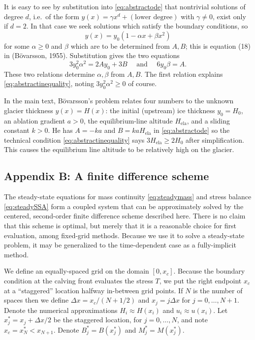 \documentclass[review,letterpaper]{igs}
\renewcommand{\dh}{\fontencoding{T1}\selectfont{\symbol{240}}}
\newcommand{\bod}{B\"o\dh varsson\xspace}
\newcommand{\citepbod}{(B\"o\dh varsson, 1955)\nocite{Bodvardsson}\xspace}
\newcommand{\Hela}{H_{\text{ela}}}
\begin{document}
It is easy to see by substitution into \eqref{eq:abstractode} that nontrivial solutions of degree $d$, i.e.~of the form $y(x) = \gamma x^d + (\text{lower degree})$ with $\gamma\ne 0$, exist only if $d=2$.  In that case we seek solutions which satisfy the boundary conditions, so
\begin{equation}
y(x) = y_0(1 - \alpha x + \beta x^2)  \label{eq:abstractsoln}
\end{equation}
for some $\alpha\ge 0$ and $\beta$ which are to be determined from $A,B$; this is equation (18) in \citepbod.  Substitution gives the two equations
\begin{equation}
3 y_0^2 \alpha^2 = 2 A y_0 + 3 B \quad \text{ and } \quad 6 y_0 \beta = A.  \label{eq:abstractrelations}
\end{equation}
These two relations determine $\alpha,\beta$ from $A,B$.  The first relation explains \eqref{eq:abstractinequality}, noting $3 y_0^2 \alpha^2 \ge 0$ of course.

In the main text, \bod's problem relates four numbers to the unknown glacier thickness $y(x)=H(x)$: the initial (upstream) ice thickness $y_0=H_0$, an ablation gradient $a>0$, the equilibrium-line altitude $\Hela$, and a sliding constant $k>0$.  He has $A=-ka$ and $B=k a \Hela$ in \eqref{eq:abstractode} so the technical condition \eqref{eq:abstractinequality} says $3 \Hela \ge 2 H_0$ after simplification.  This causes the equilibrium line altitude to be relatively high on the glacier.


\subsection{Appendix B: A finite difference scheme}  The steady-state equations for mass continuity \eqref{eq:steadymass} and stress balance \eqref{eq:steadySSA} form a coupled system that can be approximately solved by the centered, second-order finite difference scheme described here.  There is no claim that this scheme is optimal, but merely that it is a reasonable choice for first evaluation, among fixed-grid methods.  Because we use it to solve a steady-state problem, it may be generalized to the time-dependent case as a fully-implicit method.

We define an equally-spaced grid on the domain $[0,x_c]$.  Because the boundary condition at the calving front evaluates the stress $T$, we put the right endpoint $x_c$ at a ``staggered'' location halfway in-between grid points.  If $N$ is the number of spaces then we define $\Delta x = x_c / (N+1/2)$ and $x_j = j\Delta x$ for $j=0,\dots,N+1$.  Denote the numerical approximations $H_i\approx H(x_i)$ and $u_i \approx u(x_i)$.  Let $x_j^* = x_j + \Delta x/2$ be the staggered location, for $j=0,\dots,N$, and note $x_c = x_N^* < x_{N+1}$.  Denote $B_j^*=B(x_j^*)$ and $M_j^*=M(x_j^*)$.
\end{document}
